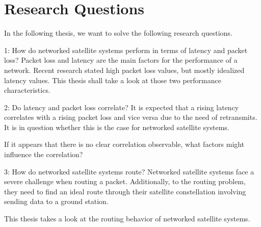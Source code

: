 \section{Research Questions} \label{sec:research-questions}

In the following thesis, we want to solve the following research questions.

\begin{rqbox}{1: How do networked satellite systems perform in terms of latency
		and packet loss?}
	Packet loss and latency are the main factors for the performance of a
	network.
	Recent research stated high packet loss values, but mostly idealized
	latency values.
	This thesis shall take a look at those two performance characteristics.
\end{rqbox}

\begin{rqbox}{2: Do latency and packet loss correlate?}
	It is expected that a rising latency correlates with a rising packet
	loss and vice versa due to the need of retransmits.
	It is in question whether this is the case for networked satellite
	systems.

	If it appears that there is no clear correlation observable, what
	factors might influence the correlation?
\end{rqbox}

\begin{rqbox}{3: How do networked satellite systems route?}
	Networked satellite systems face a severe challenge when routing a
	packet.
	Additionally, to the routing problem, they need to find an ideal route
	through their satellite constellation involving sending data to a
	ground station.

	This thesis takes a look at the routing behavior of networked satellite
	systems.
\end{rqbox}
